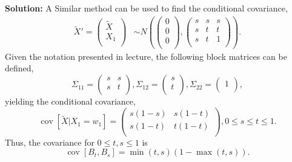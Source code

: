 \documentclass{article}[12pt]
\begin{document}
\begin{enumerate}
	\textbf{Solution: }A Similar method can be used to find the conditional covariance,
\begin{equation}
 \begin{aligned}
 	\tilde X' = \begin{pmatrix}
 		\tilde X \\
		X_1 \\
 	\end{pmatrix}
	&\sim
	N \left( \begin{pmatrix}
		0 \\ 
		0 \\
		0 \\
	\end{pmatrix}, 
\begin{pmatrix}
	s & s & s\\
	s & t & t \\
	s & t & 1 \\
\end{pmatrix}
\right).
 \end{aligned}	
\end{equation}
Given the notation presented in lecture, the following block matrices can be defined,
\begin{equation}
	\Sigma_{11}= \begin{pmatrix}
		 s & s \\
		 s & t \\
	\end{pmatrix},
	\Sigma_{12} = \begin{pmatrix}
		s \\
		t \\
	\end{pmatrix},
	\Sigma_{22} = \begin{pmatrix}
		1 \\
	\end{pmatrix},
\end{equation}
yielding the conditional covariance,
\begin{equation}
	\operatorname{cov} \left[ \tilde X | X_1 = w_1 \right] = \begin{pmatrix}
		s(1-s) & s(1-t) \\
		s(1-t) & t(1-t) \\
	\end{pmatrix}, 0 \le s \le t \le 1.
\end{equation}
Thus, the covariance for $0 \le t,s \le 1$ is
\begin{equation}
	\operatorname{cov} \left[ B_t, B_s \right] = \operatorname{min}(t, s) \left( 1 - \operatorname{max}(t, s) \right).
\end{equation}



\end{enumerate}
\end{document}
